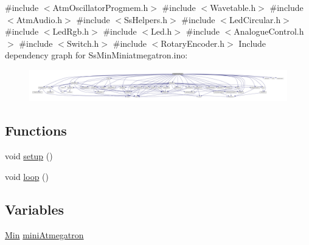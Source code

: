 {\ttfamily \#include $<$Atm\+Oscillator\+Progmem.\+h$>$}\newline
{\ttfamily \#include $<$Wavetable.\+h$>$}\newline
{\ttfamily \#include $<$Atm\+Audio.\+h$>$}\newline
{\ttfamily \#include $<$Ss\+Helpers.\+h$>$}\newline
{\ttfamily \#include $<$Led\+Circular.\+h$>$}\newline
{\ttfamily \#include $<$Led\+Rgb.\+h$>$}\newline
{\ttfamily \#include $<$Led.\+h$>$}\newline
{\ttfamily \#include $<$Analogue\+Control.\+h$>$}\newline
{\ttfamily \#include $<$Switch.\+h$>$}\newline
{\ttfamily \#include $<$Rotary\+Encoder.\+h$>$}\newline
Include dependency graph for Ss\+Min\+Miniatmegatron.\+ino\+:
\nopagebreak
\begin{figure}[H]
\begin{center}
\leavevmode
\includegraphics[width=350pt]{_ss_min_miniatmegatron_8ino__incl}
\end{center}
\end{figure}
\subsection*{Functions}
\begin{DoxyCompactItemize}
\item 
void \hyperlink{_ss_min_miniatmegatron_8ino_a4fc01d736fe50cf5b977f755b675f11d}{setup} ()
\item 
void \hyperlink{_ss_min_miniatmegatron_8ino_afe461d27b9c48d5921c00d521181f12f}{loop} ()
\end{DoxyCompactItemize}
\subsection*{Variables}
\begin{DoxyCompactItemize}
\item 
\hyperlink{class_min}{Min} \hyperlink{_ss_min_miniatmegatron_8ino_a75f390a8ad79e74fbf5ebf8f798e92e0}{mini\+Atmegatron}
\end{DoxyCompactItemize}


